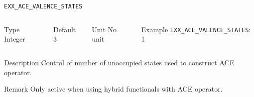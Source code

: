 \begin{frame}[allowframebreaks]{\texttt{EXX\_ACE\_VALENCE\_STATES}} \label{EXX_ACE_VALENCE_STATES}
\vspace*{-12pt}
\begin{columns}
\begin{block}{Type}
Integer
\end{block}

\begin{block}{Default}
3
\end{block}

\begin{block}{Unit}
No unit
\end{block}

\begin{block}{Example}
\texttt{EXX\_ACE\_VALENCE\_STATES}: 1
\end{block}
\end{columns}

\begin{block}{Description}
Control of number of unoccupied states used to construct ACE operator.
\end{block}

\begin{block}{Remark}
Only active when using hybrid functionals with ACE operator. 
\end{block}

\end{frame}



